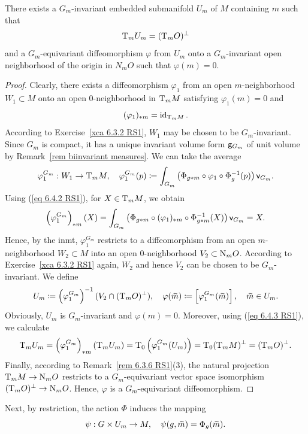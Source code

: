 \begin{lem}[{{\cite[Lem.~6.4.4]{RS1}}}]\label{lem 6.4.4 RS1}
    There exists a $G_m$-invariant embedded submanifold $U_m$ of $M$ containing $m$ such that 
    \[\mathrm{T}_mU_m=(\mathrm{T}_mO)^\perp\]
    and a $G_m$-equivariant diffeomorphism $\varphi$ from $U_m$ onto a $G_m$-invariant open neighborhood of the origin in $N_mO$ such that $\varphi(m)=0$.
\end{lem}
\begin{proof}
    Clearly, there exists a diffeomorphism $\varphi_1$ from an open $m$-neighborhood $W_1\subset M$ onto an open $0$-neighborhood in $\mathrm{T}_m M$ satisfying $\varphi_1(m)=0$ and 
    \[(\varphi_1)_{\ast m}=\operatorname{id}_{\mathrm{T}_m M}.\label{eq 6.4.2 RS1}\] According to Exercise~\ref{xca 6.3.2 RS1}, $W_1$ may be chosen to be $G_m$-invariant. Since $G_m$ is compact, it has a unique invariant volume form $\mathsf{g}_{G_m}$ of unit volume by Remark~\ref{rem biinvariant measures}. We can take the average 
    \[\varphi_1^{G_m}:W_1\to \mathrm{T}_m M,\quad \varphi_1^{G_m}(p)\coloneqq \int_{G_m}\left(\Phi_{g\ast m}\circ \varphi_1\circ \Phi_{g}^{-1}(p)\right)\mathsf{v}_{G_m}.\]
    Using (\ref{eq 6.4.2 RS1}), for $X\in\mathrm{T}_m M$, we obtain 
    \[\left(\varphi_1^{G_m}\right)_{\ast m}(X)=\int_{G_m}\left(\Phi_{g\ast m}\circ (\varphi_1)_{\ast m}\circ \Phi_{g\ast m}^{-1}(X)\right)\mathsf{v}_{G_m}=X.\label{eq 6.4.3 RS1}\]
    Hence, by the \gls{inmt}, $\varphi_1^{G_m}$ restricts to a diffeomorphism from an open $m$-neighborhood $W_2\subset M$ into an open $0$-neighborhood $V_2\subset \mathrm{N}_m O$. According to Exercise~\ref{xca 6.3.2 RS1} again, $W_2$ and hence $V_2$ can be chosen to be $G_m$-invariant. We define 
    \[U_m\coloneqq \left(\varphi_1^{G_m}\right)^{-1}(V_2\cap (\T_m O)^{\perp}),\quad \varphi(\wt m)\coloneqq \left[\varphi_1^{G_m}(\wt m)\right],\quad \wt m\in U_m.\]
    Obviously, $U_m$ is $G_m$-invariant and $\varphi(m)=0$. Moreover, using (\ref{eq 6.4.3 RS1}), we calculate 
    \[\mathrm{T}_m U_m=\left(\varphi_1^{G_m}\right)_{\ast m}(\mathrm{T}_m U_m)=\mathrm{T}_0\left(\varphi_1^{G_m}(U_m)\right)=\mathrm{T}_0(\mathrm{T}_m M)^\perp=(\mathrm{T}_m O)^\perp.\]
    Finally, according to Remark~\ref{rem 6.3.6 RS1}(3), the natural projection $\mathrm{T}_m M\to \mathrm{N}_m O$ restricts to a $G_m$-equivariant vector space isomorphism $(\mathrm{T}_m O)^\perp\to \mathrm{N}_m O$. Hence, $\varphi$ is a $G_m$-equivariant diffeomorphism.
\end{proof}

Next, by restriction, the action $\Phi$ induces the mapping
\[\psi:G\times U_m\to M,\quad \psi(g,\wt{m})=\Phi_g(\wt{m}).\]

